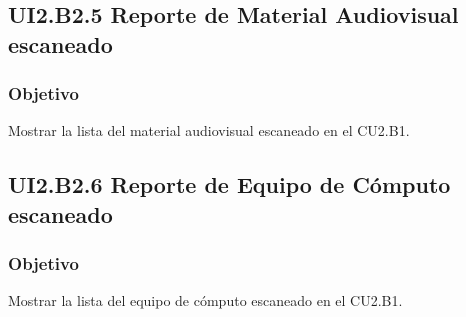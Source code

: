 \subsection{UI2.B2.5 Reporte de Material Audiovisual escaneado}

\subsubsection{Objetivo}
Mostrar la lista del material audiovisual escaneado en el CU2.B1.


\subsection{UI2.B2.6 Reporte de Equipo de Cómputo escaneado}

\subsubsection{Objetivo}
Mostrar la lista del equipo de cómputo escaneado en el CU2.B1.

